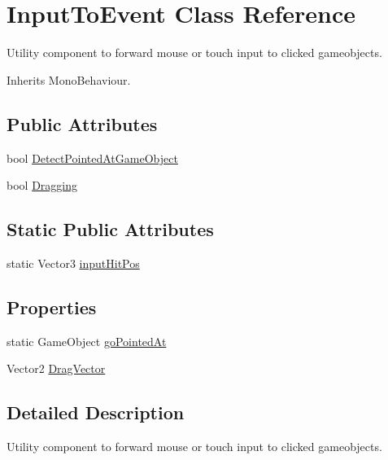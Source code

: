 \hypertarget{class_input_to_event}{}\section{Input\+To\+Event Class Reference}
\label{class_input_to_event}


Utility component to forward mouse or touch input to clicked gameobjects.  




Inherits Mono\+Behaviour.

\subsection*{Public Attributes}
\begin{DoxyCompactItemize}
\item 
bool \hyperlink{class_input_to_event_ae4f958f81632ea46ce83ef9ae8801b69}{Detect\+Pointed\+At\+Game\+Object}
\item 
bool \hyperlink{class_input_to_event_a7962fc265dae0897c0d703a4ddabf466}{Dragging}
\end{DoxyCompactItemize}
\subsection*{Static Public Attributes}
\begin{DoxyCompactItemize}
\item 
static Vector3 \hyperlink{class_input_to_event_afed01280ab0eb13db78bf20e6ddc8110}{input\+Hit\+Pos}
\end{DoxyCompactItemize}
\subsection*{Properties}
\begin{DoxyCompactItemize}
\item 
static Game\+Object \hyperlink{class_input_to_event_a174f9bb241e6abae04030a747fc50a51}{go\+Pointed\+At}
\item 
Vector2 \hyperlink{class_input_to_event_a7a515661f0f9d2367a0e603cbed88592}{Drag\+Vector}
\end{DoxyCompactItemize}


\subsection{Detailed Description}
Utility component to forward mouse or touch input to clicked gameobjects. 

